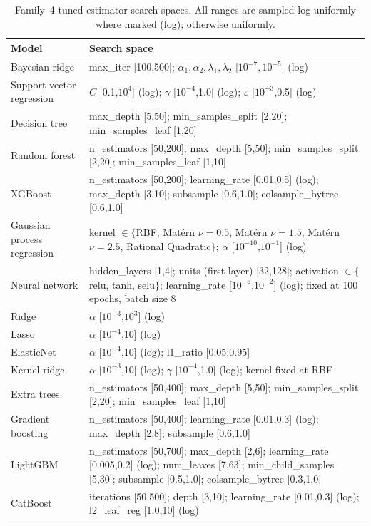 \documentclass[a4paper,11pt]{article}
\begin{document}
\begin{table}[H]
\centering
\caption{Family~4 tuned-estimator search spaces. All ranges are sampled log-uniformly where marked (log); otherwise uniformly.}
\label{tab:armote_tuned}
\small
\begin{tabular}{@{}lp{7.4cm}@{}}
\toprule
Model & Search space \\
\midrule
Bayesian ridge & max\_iter [100,500]; $\alpha_1,\alpha_2,\lambda_1,\lambda_2$ [$10^{-7},10^{-5}$] (log) \\
Support vector regression & $C$ [0.1,$10^4$] (log); $\gamma$ [$10^{-4}$,1.0] (log); $\varepsilon$ [$10^{-3}$,0.5] (log) \\
Decision tree & max\_depth [5,50]; min\_samples\_split [2,20]; min\_samples\_leaf [1,20] \\
Random forest & n\_estimators [50,200]; max\_depth [5,50]; min\_samples\_split [2,20]; min\_samples\_leaf [1,10] \\
XGBoost & n\_estimators [50,200]; learning\_rate [0.01,0.5] (log); max\_depth [3,10]; subsample [0.6,1.0]; colsample\_bytree [0.6,1.0] \\
Gaussian process regression & kernel $\in\{$RBF, Mat\'ern $\nu{=}0.5$, Mat\'ern $\nu{=}1.5$, Mat\'ern $\nu{=}2.5$, Rational Quadratic$\}$; $\alpha$ [$10^{-10}$,$10^{-1}$] (log) \\
Neural network & hidden\_layers [1,4]; units (first layer) [32,128]; activation $\in\{$relu, tanh, selu$\}$; learning\_rate [$10^{-5}$,$10^{-2}$] (log); fixed at 100 epochs, batch size 8 \\
Ridge & $\alpha$ [$10^{-3}$,$10^{3}$] (log) \\
Lasso & $\alpha$ [$10^{-4}$,10] (log) \\
ElasticNet & $\alpha$ [$10^{-4}$,10] (log); l1\_ratio [0.05,0.95] \\
Kernel ridge & $\alpha$ [$10^{-3}$,10] (log); $\gamma$ [$10^{-4}$,1.0] (log); kernel fixed at RBF \\
Extra trees & n\_estimators [50,400]; max\_depth [5,50]; min\_samples\_split [2,20]; min\_samples\_leaf [1,10] \\
Gradient boosting & n\_estimators [50,400]; learning\_rate [0.01,0.3] (log); max\_depth [2,8]; subsample [0.6,1.0] \\
LightGBM & n\_estimators [50,700]; max\_depth [2,6]; learning\_rate [0.005,0.2] (log); num\_leaves [7,63]; min\_child\_samples [5,30]; subsample [0.5,1.0]; colsample\_bytree [0.3,1.0] \\
CatBoost & iterations [50,500]; depth [3,10]; learning\_rate [0.01,0.3] (log); l2\_leaf\_reg [1.0,10] (log) \\
\bottomrule
\end{tabular}
\end{table}
\end{document}
